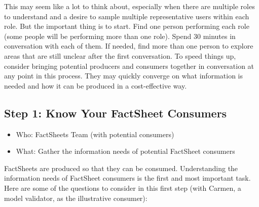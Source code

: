 \documentclass[11pt,dvipdfm]{article}
\begin{document}
This may seem like a lot to think about, especially when there are multiple roles to understand and a desire to  sample multiple representative users within each role. But the important thing is to start. Find one person performing each role (some people will be performing more than one role). Spend 30 minutes in conversation with each of them. If needed, find more than one person to explore areas that are still unclear after the first conversation. To speed things up, consider bringing potential producers and consumers together in conversation at any point in this process. They may quickly converge on what information is needed and how it can be produced in a cost-effective way. 



\subsection{Step 1: Know Your FactSheet Consumers}

\begin{itemize}[noitemsep,nolistsep]
    \item Who: FactSheets Team (with potential consumers)
    \item What: Gather the information needs of potential FactSheet consumers
\end{itemize}
\hspace{.2cm}

FactSheets are produced so that they can be consumed. Understanding the information needs of FactSheet consumers is the first and most important task. Here are some of the questions to consider in this first step (with Carmen, a model validator, as the illustrative consumer):\\
\end{document}

